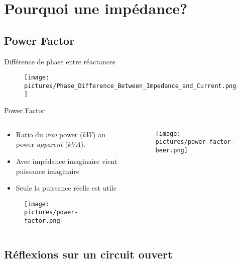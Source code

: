 
\section{Pourquoi une impédance?}

\subsection{Power Factor}
\begin{frame}{Différence de phase entre réactances}
    \begin{figure}
        \centering
        \texttt{[image: pictures/Phase\_Difference\_Between\_Impedance\_and\_Current.png]}
    \end{figure}
\end{frame}

\begin{frame}{Power Factor}
    \begin{columns}
        \begin{column}{0.5\textwidth}
            \begin{itemize}
                \item Ratio du \textit{vrai} power ($kW$) au power \textit{apparent} ($kVA$).
                \item Avec impédance imaginaire vient puissance imaginaire
                \item Seule la puissance réelle est utile
            \end{itemize}
            \begin{figure}
                \centering
                \texttt{[image: pictures/power-factor.png]}
            \end{figure}
        \end{column}
        \begin{column}{0.5\textwidth}
            \begin{figure}
                \centering
                \texttt{[image: pictures/power-factor-beer.png]}
            \end{figure}
        \end{column}
    \end{columns}
\end{frame}


\subsection{Réflexions sur un circuit ouvert}

